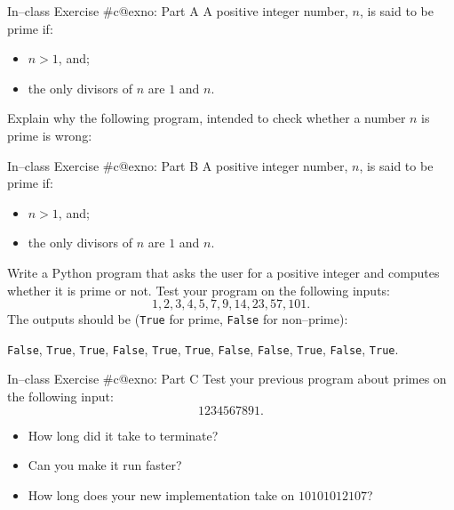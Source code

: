 \documentclass[aspectratio=169, 12pt, xcolor=table]{beamer}
\makeatletter
\newcommand{\arabicthree}[1]{\expandafter\@arabicthree\csname c@#1\endcsname}
\newcommand{\@arabicthree}[1]{\ifnum #1<100 0\fi\ifnum #1<10 0\fi\number#1}
\newcounter{exno}
\newcommand{\exno}{\stepcounter{exno}In--class Exercise \#\arabicthree{exno}}
\makeatother
\begin{document}
	\begin{frame}{\exno: Part A}
		A positive integer number, $n$, is said to be prime if:
		\begin{itemize}
			\item $n>1$, and;
			\item the only divisors of $n$ are $1$ and $n$.
		\end{itemize}
		Explain why the following program, intended to check whether a number $n$ is prime is wrong:
		
	\end{frame}
	
	\addtocounter{exno}{-1}
	
	\begin{frame}{\exno: Part B}
		A positive integer number, $n$, is said to be prime if:
		\begin{itemize}
			\item $n>1$, and;
			\item the only divisors of $n$ are $1$ and $n$.
		\end{itemize}
		Write a Python program that asks the user for a positive integer and computes whether it is prime or not. Test your program on the following inputs:
		\[1, 2, 3, 4, 5, 7, 9, 14, 23, 57, 101.\]
		The outputs should be (\texttt{True} for prime, \texttt{False} for non--prime):
		\begin{center}
			\texttt{False}, \texttt{True}, \texttt{True}, \texttt{False}, \texttt{True}, \texttt{True}, \texttt{False}, \texttt{False}, \texttt{True}, \texttt{False}, \texttt{True}.
		\end{center}
	\end{frame}
	
	\addtocounter{exno}{-1}
	
	\begin{frame}{\exno: Part C}
		Test your previous program about primes on the following input:
		\[1234567891.\]
		\vspace{-\topsep}
		\begin{itemize}
			\item How long did it take to terminate?
			\item Can you make it run faster?
			\item How long does your new implementation take on $10101012107$?
		\end{itemize}
	\end{frame}
	
\end{document}

